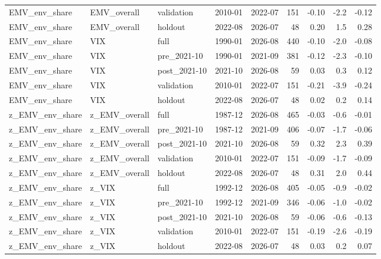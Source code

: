 \begin{table}
\begin{tabular}{lllllrrrr}
EMV\_env\_share & EMV\_overall & validation & 2010-01 & 2022-07 & 151 & -0.10 & -2.2 & -0.12 \\
EMV\_env\_share & EMV\_overall & holdout & 2022-08 & 2026-07 & 48 & 0.20 & 1.5 & 0.28 \\
EMV\_env\_share & VIX & full & 1990-01 & 2026-08 & 440 & -0.10 & -2.0 & -0.08 \\
EMV\_env\_share & VIX & pre\_2021-10 & 1990-01 & 2021-09 & 381 & -0.12 & -2.3 & -0.10 \\
EMV\_env\_share & VIX & post\_2021-10 & 2021-10 & 2026-08 & 59 & 0.03 & 0.3 & 0.12 \\
EMV\_env\_share & VIX & validation & 2010-01 & 2022-07 & 151 & -0.21 & -3.9 & -0.24 \\
EMV\_env\_share & VIX & holdout & 2022-08 & 2026-07 & 48 & 0.02 & 0.2 & 0.14 \\
z\_EMV\_env\_share & z\_EMV\_overall & full & 1987-12 & 2026-08 & 465 & -0.03 & -0.6 & -0.01 \\
z\_EMV\_env\_share & z\_EMV\_overall & pre\_2021-10 & 1987-12 & 2021-09 & 406 & -0.07 & -1.7 & -0.06 \\
z\_EMV\_env\_share & z\_EMV\_overall & post\_2021-10 & 2021-10 & 2026-08 & 59 & 0.32 & 2.3 & 0.39 \\
z\_EMV\_env\_share & z\_EMV\_overall & validation & 2010-01 & 2022-07 & 151 & -0.09 & -1.7 & -0.09 \\
z\_EMV\_env\_share & z\_EMV\_overall & holdout & 2022-08 & 2026-07 & 48 & 0.31 & 2.0 & 0.44 \\
z\_EMV\_env\_share & z\_VIX & full & 1992-12 & 2026-08 & 405 & -0.05 & -0.9 & -0.02 \\
z\_EMV\_env\_share & z\_VIX & pre\_2021-10 & 1992-12 & 2021-09 & 346 & -0.06 & -1.0 & -0.02 \\
z\_EMV\_env\_share & z\_VIX & post\_2021-10 & 2021-10 & 2026-08 & 59 & -0.06 & -0.6 & -0.13 \\
z\_EMV\_env\_share & z\_VIX & validation & 2010-01 & 2022-07 & 151 & -0.19 & -2.6 & -0.19 \\
z\_EMV\_env\_share & z\_VIX & holdout & 2022-08 & 2026-07 & 48 & 0.03 & 0.2 & 0.07 \\
\bottomrule
\end{tabular}
\end{table}
